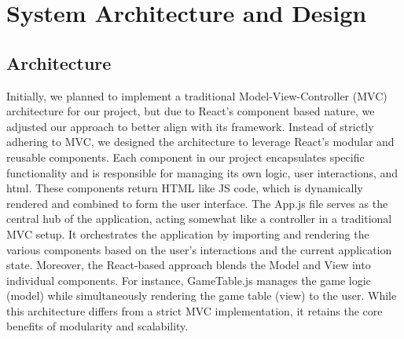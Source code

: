 \section{System Architecture and Design}



\subsection{Architecture}
Initially, we planned to implement a traditional Model-View-Controller (MVC) architecture for our project, but due to React's component based nature, we adjusted our approach to better align with its framework. Instead of strictly adhering to MVC, we designed the architecture to leverage React's modular and reusable components. Each component in our project encapsulates specific functionality and is responsible for managing its own logic, user interactions, and html. These components return HTML like JS code, which is dynamically rendered and combined to form the user interface. The App.js file serves as the central hub of the application, acting somewhat like a controller in a traditional MVC setup. It orchestrates the application by importing and rendering the various components based on the user's interactions and the current application state. Moreover, the React-based approach blends the Model and View into individual components. For instance, GameTable.js manages the game logic (model) while simultaneously rendering the game table (view) to the user. While this architecture differs from a strict MVC implementation, it retains the core benefits of modularity and scalability.

